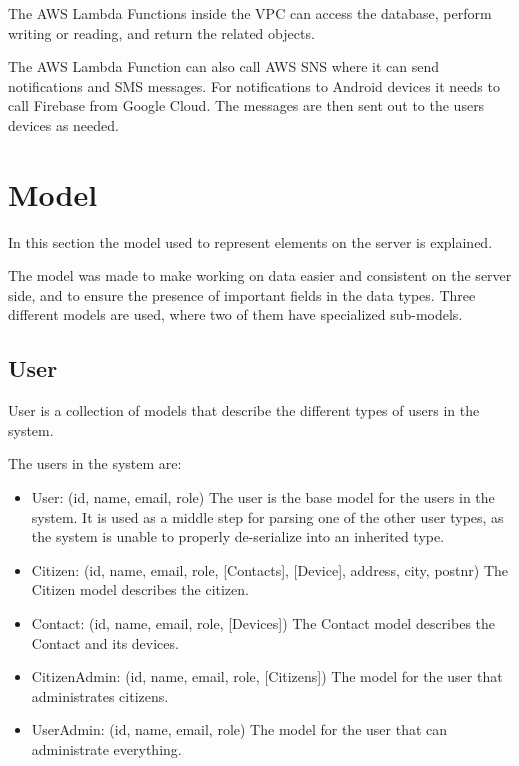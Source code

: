 The AWS Lambda Functions inside the VPC can access the database, perform writing or reading, and return the related objects.

The AWS Lambda Function can also call AWS SNS where it can send notifications and SMS messages. For notifications to Android devices it needs to call Firebase from Google Cloud. The messages are then sent out to the users devices as needed.


\section{Model}\label{model}
In this section the model used to represent elements on the server is explained.

The model was made to make working on data easier and consistent on the server side, and to ensure the presence of important fields in the data types. Three different models are used, where two of them have specialized sub-models.

\subsection{User}
User is a collection of models that describe the different types of users in the system.

The users in the system are:
\begin{itemize}
    \item User: (id, name, email, role) \newline
    The user is the base model for the users in the system. It is used as a middle step for parsing one of the other user types, as the system is unable to properly de-serialize into an inherited type.
    \item Citizen: (id, name, email, role, [Contacts], [Device], address, city, postnr) \newline
    The Citizen model describes the citizen.  
    \item Contact: (id, name, email, role, [Devices]) \newline
    The Contact model describes the Contact and its devices.
    \item CitizenAdmin: (id, name, email, role, [Citizens]) \newline
    The model for the user that administrates citizens.
    \item UserAdmin: (id, name, email, role) \newline
    The model for the user that can administrate everything.
\end{itemize}


